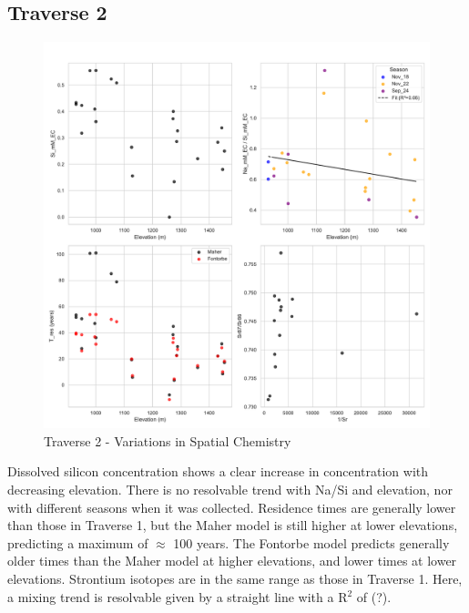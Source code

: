 \newpage

\subsection{Traverse 2}

\begin{figure}[h]
    \centering
        \includegraphics[width=\textwidth]{Traverse_2_summary.pdf}
    \caption{Traverse 2 - Variations in Spatial Chemistry}
    \label{fig:spatial_changes_spring2}
\end{figure}

\FloatBarrier

Dissolved silicon concentration shows a clear increase in concentration with decreasing elevation. There is no resolvable trend with Na/Si and elevation, nor with different seasons when it was collected. Residence times are generally lower than those in Traverse 1, but the Maher model is still higher at lower elevations, predicting a maximum of $\approx$ 100 years. The Fontorbe model predicts generally older times than the Maher model at higher elevations, and lower times at lower elevations. Strontium isotopes are in the same range as those in Traverse 1. Here, a mixing trend is resolvable given by a straight line with a R$^2$ of (?).






